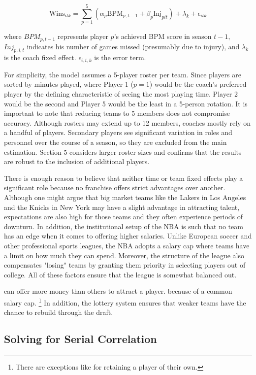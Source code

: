 \documentclass[main.tex]{subfiles}
\begin{document}
\begin{equation}
\text{Wins}_{itk} = \sum_{p=1}^{5}(\alpha_{p}\text{BPM}_{p,t-1} + \beta_{p}\text{Inj}_{pit}) + \lambda_{k} + \epsilon_{itk}
\end{equation}

where ${BPM}_{p,t-1}$ represents player $p$'s achieved BPM score in season $t-1$, ${Inj}_{p,i,t}$ indicates his number of games missed (presumably due to injury), and $\lambda_{k}$ is the coach fixed effect. $\epsilon_{i,t,k}$ is the error term. 

For simplicity, the model assumes a 5-player roster per team. Since players are sorted by minutes played, where Player 1 ($p = 1$) would be the coach's preferred player by the defining characteristic of seeing the most playing time. Player 2 would be the second and Player 5 would be the least in a 5-person rotation. It is important to note that reducing teams to 5 members does not compromise accuracy. Although rosters may extend up to 12 members, coaches mostly rely on a handful of players. Secondary players see significant variation in roles and personnel over the course of a season, so they are excluded from the main estimation. Section 5 considers larger roster sizes and confirms that the results are robust to the inclusion of additional players.

There is enough reason to believe that neither time or team fixed effects play a significant role because no franchise offers strict advantages over another. Although one might argue that big market teams like the Lakers in Los Angeles and the Knicks in New York may have a slight advantage in attracting talent, expectations are also high for those teams and they often experience periods of downturn.  In addition, the institutional setup of the NBA is such that no team has an edge when it comes to offering higher salaries. Unlike European soccer and other professional sports leagues, the NBA adopts a salary cap where teams have a limit on how much they can spend. Moreover, the structure of the league also compensates "losing" teams by granting them priority in selecting players out of college. All of these factors ensure that the league is somewhat balanced out. 

can offer more money than others to attract a player. because of a common salary cap. \footnote{There are exceptions like for retaining a player of their own.} In addition, the lottery system ensures that weaker teams have the chance to rebuild through the draft. 

\subsection{Solving for Serial Correlation}
\end{document}
